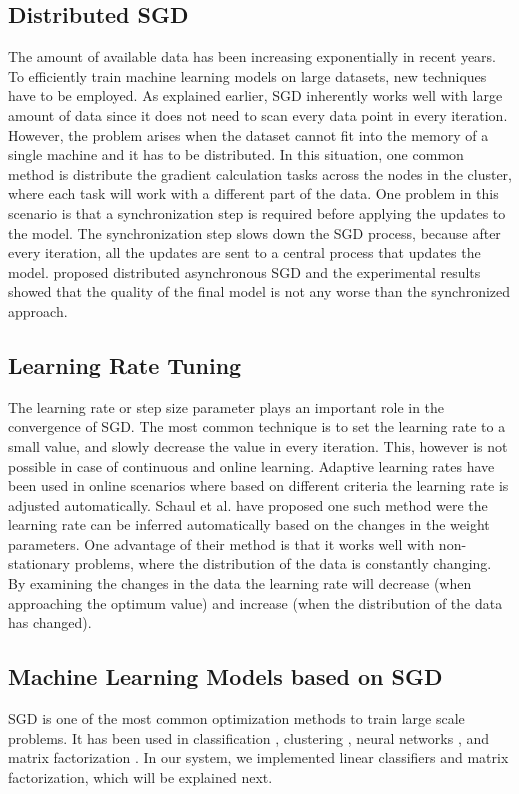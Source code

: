 \documentclass{vldb}
\begin{document}
\subsection{Distributed SGD}
The amount of available data has been increasing exponentially in recent years.
To efficiently train machine learning models on large datasets, new techniques have to be employed.
As explained earlier, SGD inherently works well with large amount of data since it does not need to scan every data point in every iteration.
However, the problem arises when the dataset cannot fit into the memory of a single machine and it has to be distributed.
In this situation, one common method is distribute the gradient calculation tasks across the nodes in the cluster, where each task will work with a different part of the data.
One problem in this scenario is that a synchronization step is required before applying the updates to the model. 
The synchronization step slows down the SGD process, because after every iteration, all the updates are sent to a central process that updates the model.
\cite{recht2011hogwild, dean2012large} proposed distributed asynchronous SGD and the experimental results showed that the quality of the final model is not any worse than the synchronized approach. 

\subsection{Learning Rate Tuning} \label{learning-rate}
The learning rate or step size parameter plays an important role in the convergence of SGD.
The most common technique is to set the learning rate to a small value, and slowly decrease the value in every iteration. 
This, however is not possible in case of continuous and online learning. 
Adaptive learning rates have been used in online scenarios where based on different criteria the learning rate is adjusted automatically.
Schaul et al. \cite{schaul2013no} have proposed one such method were the learning rate can be inferred automatically based on the changes in the weight parameters. 
One advantage of their method is that it works well with non-stationary problems, where the distribution of the data is constantly changing. 
By examining the changes in the data the learning rate will decrease (when approaching the optimum value) and increase (when the distribution of the data has changed).

\subsection{Machine Learning Models based on SGD}
SGD is one of the most common optimization methods to train large scale problems. 
It has been used in classification \cite{zhang2004solving}, clustering \cite{bottou1995convergence}, neural networks \cite{dean2012large}, and matrix factorization \cite{funk2006netflix}.
In our system, we implemented linear classifiers and matrix factorization, which will be explained next. 
\end{document}
